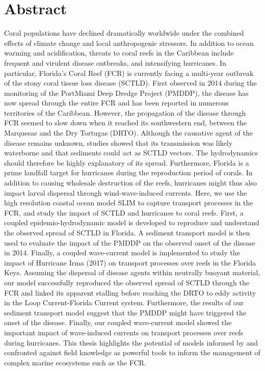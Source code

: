 
\chapter*{Abstract}

Coral populations have declined dramatically worldwide under the combined effects of climate change and local anthropogenic stressors. In addition to ocean warming and acidification, threats to coral reefs in the Caribbean include frequent and virulent disease outbreaks, and intensifying hurricanes. In particular, Florida's Coral Reef (FCR) is currently facing a multi-year outbreak of the stony coral tissue loss disease (SCTLD). First observed in 2014 during the monitoring of the PortMiami Deep Dredge Project (PMDDP), the disease has now spread through the entire FCR and has been reported in numerous territories of the Caribbean. However, the propagation of the disease through FCR seemed to slow down when it reached its southwestern end, between the Marquesas and the Dry Tortugas (DRTO). Although the causative agent of the disease remains unknown, studies showed that its transmission was likely waterborne and that sediments could act as SCTLD vectors. The hydrodynamics should therefore be highly explanatory of its spread. Furthermore, Florida is a prime landfall target for hurricanes during the reproduction period of corals. In addition to causing wholesale destruction of the reefs, hurricanes might thus also impact larval dispersal through wind-wave-induced currents. Here, we use the high resolution coastal ocean model SLIM to capture transport processes in the FCR, and study the impact of SCTLD and hurricanes to coral reefs. First, a coupled epidemio-hydrodynamic model is developed to reproduce and understand the observed spread of SCTLD in Florida. A sediment transport model is then used to evaluate the impact of the PMDDP on the observed onset of the disease in 2014. Finally, a coupled wave-current model is implemented to study the impact of Hurricane Irma (2017) on transport processes over reefs in the Florida Keys. Assuming the dispersal of disease agents within neutrally buoyant material, our model successfully reproduced the observed spread of SCTLD through the FCR and linked its apparent stalling before reaching the DRTO to eddy activity in the Loop Current-Florida Current system. Furthermore, the results of our sediment transport model suggest that the PMDDP might have triggered the onset of the disease. Finally, our coupled wave-current model showed the important impact of wave-induced currents on transport processes over reefs during hurricanes. This thesis highlights the potential of models informed by and confronted against field knowledge as powerful tools to inform the management of complex marine ecosystems such as the FCR.

